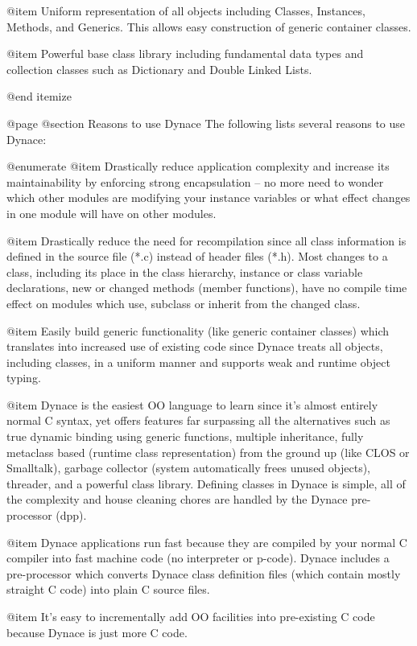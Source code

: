 @item Uniform representation of all objects including Classes, Instances,
Methods, and Generics.  This allows easy construction of generic container
classes.

@item Powerful base class library including fundamental data types and
collection classes such as Dictionary and Double Linked Lists.

@end itemize


@page
@section Reasons to use Dynace
The following lists several reasons to use Dynace:

@enumerate
@item
Drastically reduce application complexity and increase its
maintainability by enforcing strong encapsulation -- no more need to
wonder which other modules are modifying your instance variables or
what effect changes in one module will have on other modules.

@item
Drastically reduce the need for recompilation since all class information
is defined in the source file (*.c) instead of header files (*.h).  Most
changes to a class, including its place in the class hierarchy, instance
or class variable declarations, new or changed methods (member functions),
have no compile time effect on modules which use, subclass or inherit 
from the changed class.

@item
Easily build generic functionality (like generic container classes)
which translates into increased use of existing code since Dynace
treats all objects, including classes, in a uniform manner and supports
weak and runtime object typing.

@item
Dynace is the easiest OO language to learn since it's almost entirely
normal C syntax, yet offers features far surpassing all the alternatives
such as true dynamic binding using generic functions, multiple inheritance,
fully metaclass based (runtime class representation) from the ground up
(like CLOS or Smalltalk), garbage collector (system automatically frees
unused objects), threader, and a powerful class library.  Defining classes
in Dynace is simple, all of the complexity and house cleaning chores are
handled by the Dynace pre-processor (dpp).

@item
Dynace applications run fast because they are compiled by your normal
C compiler into fast machine code (no interpreter or p-code).  Dynace
includes a pre-processor which converts Dynace class definition files
(which contain mostly straight C code) into plain C source files.

@item
It's easy to incrementally add OO facilities into pre-existing C code
because Dynace is just more C code.

